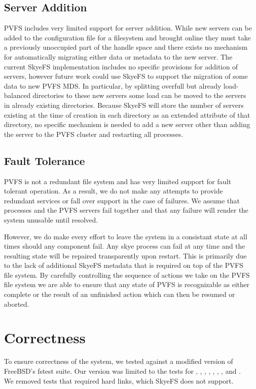 \documentclass[onecolumn, 11pt, letterpaper]{article}
\begin{document}
\subsection{Server Addition}
PVFS includes very limited support for server addition.  While new servers can
be added to the configuration file for a filesystem and brought online they must
take a previously unoccupied part of the handle space and there exists no
mechanism for automatically migrating either data or metadata to the new server.
The current SkyeFS implementation includes no specific provisions for addition
of servers, however future work could use SkyeFS to support the migration of
some data to new PVFS MDS.  In particular, by splitting overfull but already
load-balanced directories to these new servers some load can be moved to the
servers in already existing directories.  Because SkyeFS will store the number of
servers existing at the time of creation in each directory as an extended
attribute of that directory, no
specific mechanism is needed to add a new server other than adding the server
to the PVFS cluster and restarting all  processes.

\subsection{Fault Tolerance}
PVFS is not a redundant file system and has very limited support for fault
tolerant operation.  As a result, we do not make any
attempts to provide redundant services or fall over support in the case of
failures.  We assume that  processes and the PVFS servers fail
together and that any failure will render the system unusable until resolved.

However, we do make every effort to leave the system in a consistant state at
all times should any component fail.  Any skye process can fail at any time
and the resulting state will be repaired transparently upon restart.  This is
primarily due to the lack of additional SkyeFS metadata that is required on
top of the PVFS file system.  By carefully controlling the sequence of actions
we take on the PVFS file system we are able to ensure that any state of PVFS
is recognizable as either complete or the result of an unfinished action which
can then be resumed or aborted.

\section{Correctness}
To ensure correctness of the system, we tested against a modified version of
FreeBSD's fstest suite.\cite{fstest} Our version was limited to the tests for
, , , , ,
, ,  and .  We removed
tests that required hard links, which SkyeFS does not support.
\end{document}
